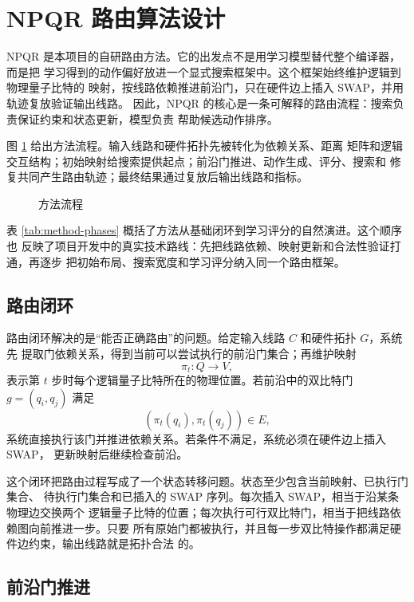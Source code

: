 \section{NPQR 路由算法设计}

NPQR 是本项目的自研路由方法。它的出发点不是用学习模型替代整个编译器，而是把
学习得到的动作偏好放进一个显式搜索框架中。这个框架始终维护逻辑到物理量子比特的
映射，按线路依赖推进前沿门，只在硬件边上插入 SWAP，并用轨迹复放验证输出线路。
因此，NPQR 的核心是一条可解释的路由流程：搜索负责保证约束和状态更新，模型负责
帮助候选动作排序。

图 \ref{fig:npqr-flow} 给出方法流程。输入线路和硬件拓扑先被转化为依赖关系、距离
矩阵和逻辑交互结构；初始映射给搜索提供起点；前沿门推进、动作生成、评分、搜索和
修复共同产生路由轨迹；最终结果通过复放后输出线路和指标。

\begin{figure}[H]
  \centering
  
  \caption{方法流程}
  \label{fig:npqr-flow}
\end{figure}

表 \ref{tab:method-phases} 概括了方法从基础闭环到学习评分的自然演进。这个顺序也
反映了项目开发中的真实技术路线：先把线路依赖、映射更新和合法性验证打通，再逐步
把初始布局、搜索宽度和学习评分纳入同一个路由框架。



\subsection{路由闭环}

路由闭环解决的是“能否正确路由”的问题。给定输入线路 $C$ 和硬件拓扑 $G$，系统先
提取门依赖关系，得到当前可以尝试执行的前沿门集合；再维护映射
\[
  \pi_t:Q\rightarrow V,
\]
表示第 $t$ 步时每个逻辑量子比特所在的物理位置。若前沿中的双比特门
$g=(q_i,q_j)$ 满足
\[
  (\pi_t(q_i),\pi_t(q_j))\in E,
\]
系统直接执行该门并推进依赖关系。若条件不满足，系统必须在硬件边上插入 SWAP，
更新映射后继续检查前沿。

这个闭环把路由过程写成了一个状态转移问题。状态至少包含当前映射、已执行门集合、
待执行门集合和已插入的 SWAP 序列。每次插入 SWAP，相当于沿某条物理边交换两个
逻辑量子比特的位置；每次执行可行双比特门，相当于把线路依赖图向前推进一步。只要
所有原始门都被执行，并且每一步双比特操作都满足硬件边约束，输出线路就是拓扑合法
的。



\subsection{前沿门推进}

